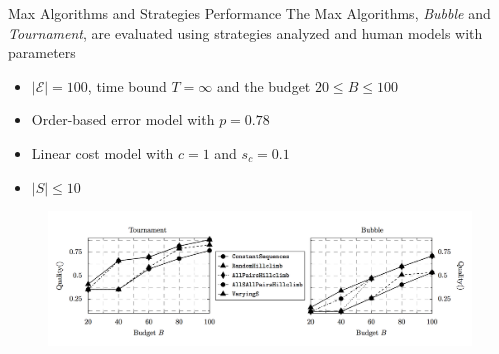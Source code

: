 \documentclass{beamer}
\begin{document}
\begin{frame}{Max Algorithms and Strategies Performance}
\vspace{5pt}
The Max Algorithms, \textit{\color{beaver_red}Bubble} and \textit{\color{beaver_red}Tournament}, are evaluated using strategies analyzed and human models with parameters
\begin{itemize}
	\item $\left\vert{\mathcal{E}}\right\vert=100$, time bound $T=\infty$ and the budget $20 \le B \le 100$
	\item Order-based error model with $p=0.78$
	\item Linear cost model with $c=1$ and $s_c = 0.1$   %
	\item $\left\vert{S}\right\vert\le10$ %
\end{itemize}
\begin{figure}
	\centering
	\includegraphics[scale=0.3]{images/algoexp.png}
\end{figure}

\end{frame}

\end{document}
